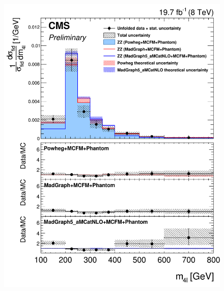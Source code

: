 \begin{figure}[hbtp]
  \begin{center}
    \includegraphics[width=\cmsFigWidth]{Figures/DiffCrossSecZZTo4mMass_Unfolded_fr_Powheg_norm.png}     

\end{center}
\end{figure}
